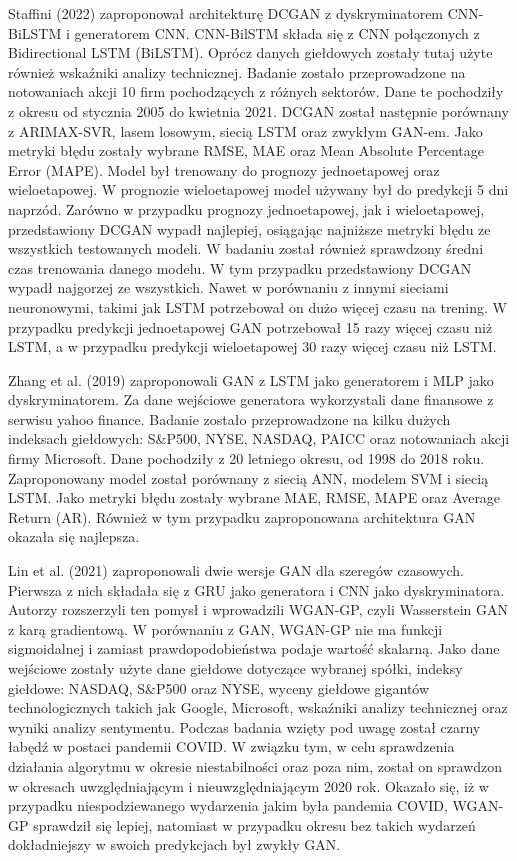 \documentclass[review]{elsarticle} %
\begin{document}
Staffini (2022) zaproponował architekturę DCGAN z dyskryminatorem CNN-BiLSTM i generatorem CNN. CNN-BilSTM składa się z CNN połączonych z Bidirectional LSTM (BiLSTM). Oprócz danych giełdowych zostały tutaj użyte również wskaźniki analizy technicznej. Badanie zostało przeprowadzone na notowaniach akcji 10 firm pochodzących z różnych sektorów. Dane te pochodziły z okresu od stycznia 2005 do kwietnia 2021. DCGAN został następnie porównany z ARIMAX-SVR, lasem losowym, siecią LSTM oraz zwykłym GAN-em. Jako metryki błędu zostały wybrane RMSE, MAE oraz Mean Absolute Percentage Error (MAPE). Model był trenowany do prognozy jednoetapowej oraz wieloetapowej. W prognozie wieloetapowej model używany był do predykcji 5 dni naprzód. Zarówno w przypadku prognozy jednoetapowej, jak i wieloetapowej, przedstawiony DCGAN wypadł najlepiej, osiągając najniższe metryki błędu ze wszystkich testowanych modeli. W badaniu został również sprawdzony średni czas trenowania danego modelu. W tym przypadku przedstawiony DCGAN wypadł najgorzej ze wszystkich.  Nawet w porównaniu z innymi sieciami neuronowymi, takimi jak LSTM potrzebował on dużo więcej czasu na trening. W przypadku predykcji jednoetapowej GAN potrzebował 15 razy więcej czasu niż LSTM, a w przypadku predykcji wieloetapowej 30 razy więcej czasu niż LSTM. 

Zhang et al. (2019) zaproponowali GAN z LSTM jako generatorem i MLP jako dyskryminatorem. Za dane wejściowe generatora wykorzystali dane finansowe z serwisu yahoo finance. Badanie zostało przeprowadzone na kilku dużych indeksach giełdowych: S\&P500, NYSE, NASDAQ, PAICC oraz notowaniach akcji firmy Microsoft. Dane pochodziły z 20 letniego okresu, od 1998 do 2018 roku. Zaproponowany model został porównany z siecią ANN, modelem SVM i siecią LSTM. Jako metryki błędu zostały wybrane MAE, RMSE, MAPE oraz Average Return (AR). Również w tym przypadku zaproponowana architektura GAN okazała się najlepsza. 

Lin et al. (2021) zaproponowali dwie wersje GAN dla szeregów czasowych. Pierwsza z nich składała się z GRU jako generatora i CNN jako dyskryminatora. Autorzy rozszerzyli ten pomysł i wprowadzili WGAN-GP, czyli Wasserstein GAN z karą gradientową. W porównaniu z GAN, WGAN-GP nie ma funkcji sigmoidalnej i zamiast prawdopodobieństwa podaje wartość skalarną. Jako dane wejściowe zostały użyte dane giełdowe dotyczące wybranej spółki, indeksy giełdowe: NASDAQ, S\&P500 oraz NYSE, wyceny giełdowe gigantów technologicznych takich jak Google, Microsoft, wskaźniki analizy technicznej oraz wyniki analizy sentymentu. Podczas badania wzięty pod uwagę został czarny łabędź w postaci pandemii COVID. W związku tym, w celu sprawdzenia działania algorytmu w okresie niestabilności oraz poza nim, został on sprawdzon w okresach uwzględniającym i nieuwzględniającym 2020 rok. Okazało się, iż w przypadku niespodziewanego wydarzenia jakim była pandemia COVID, WGAN-GP sprawdził się lepiej, natomiast w przypadku okresu bez takich wydarzeń dokładniejszy w swoich predykcjach był zwykły GAN.
\end{document}
